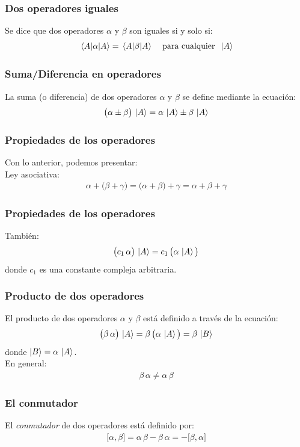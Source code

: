 \documentclass[12pt]{beamer}
\begin{document}
\begin{frame}
\frametitle{Dos operadores iguales}
Se dice que dos operadores $\alpha$ y $\beta$ son iguales si y solo si:
\pause
\begin{align*}
\mel{A}{\alpha}{A} = \mel{A}{\beta}{A} \hspace{0.4cm} \mbox{para cualquier} \hspace{0.2cm} \ket{A}
\end{align*}
\end{frame}
\begin{frame}
\frametitle{Suma/Diferencia en operadores}
La suma (o diferencia) de dos operadores $\alpha$ y $\beta$ se define mediante la ecuación:
\pause
\begin{align*}
\big( \alpha \pm \beta \big) \, \ket{A} = \alpha \, \ket{A} \pm \beta \, \ket{A}
\end{align*}
\end{frame}
\begin{frame}
\frametitle{Propiedades de los operadores}
Con lo anterior, podemos presentar:
\\
\pause
Ley asociativa:
\pause
\begin{align*}
\alpha + \big( \beta + \gamma \big) = \big( \alpha + \beta \big) + \gamma = \alpha + \beta + \gamma
\end{align*}
\end{frame}
\begin{frame}
\frametitle{Propiedades de los operadores}
También:
\pause
\begin{align*}
\big( c_{1} \, \alpha \big) \, \ket{A} = c_{1} \, \big( \alpha \, \ket{A} \big)
\end{align*}
donde $c_{1}$ es una constante compleja arbitraria.
\end{frame}
\begin{frame}
\frametitle{Producto de dos operadores}
El producto de dos operadores $\alpha$ y $\beta$ está
definido a través de la ecuación:
\pause
\begin{align*}
\big( \beta \, \alpha \big) \, \ket{A} = \beta \, \big( \alpha \, \ket{A} \big) = \beta \, \ket{B}
\end{align*}
donde $\ket{B} = \alpha \, \ket{A}$.
\\
\bigskip
\pause
En general:
\begin{align*}
\beta \, \alpha \neq \alpha \, \beta
\end{align*}
\end{frame}
\begin{frame}
\frametitle{El conmutador}
El \emph{conmutador} de dos operadores está definido por: 
\pause
\begin{align*}
\big[ \alpha, \beta \big] = \alpha \, \beta - \beta \, \alpha = - \big[ \beta, \alpha \big]
\end{align*}
\end{frame}
\end{document}
